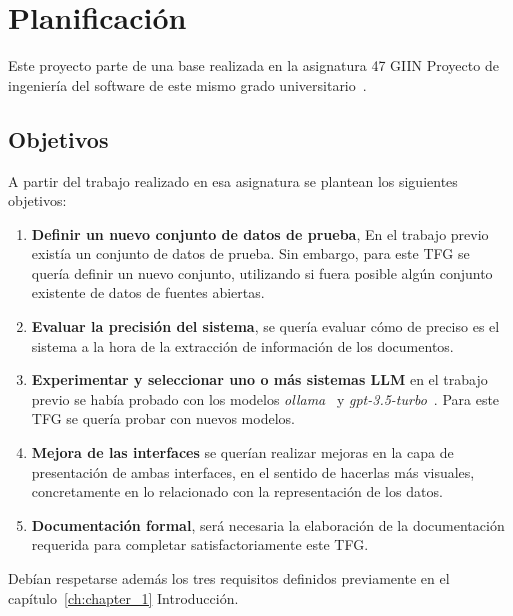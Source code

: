 \section{Planificación}\label{sec:desarrollo_de_software}

Este proyecto parte de una base realizada en la asignatura 47 GIIN Proyecto de ingeniería del
software de este mismo grado universitario~\cite{url_viu_47_proyecto}.

\subsection*{Objetivos}

A partir del trabajo realizado en esa asignatura se plantean los siguientes objetivos:

\begin{enumerate}
    \item \textbf{Definir un nuevo conjunto de datos de prueba},
    En el trabajo previo existía un conjunto de datos de prueba.
    Sin embargo, para este TFG se quería definir un nuevo conjunto, utilizando si fuera posible algún conjunto existente
    de datos de fuentes abiertas.

    \item \textbf{Evaluar la precisión del sistema},
    se quería evaluar cómo de preciso es el sistema a la hora de la extracción de información de los documentos.

    \item \textbf{Experimentar y seleccionar uno o más sistemas LLM}
    en el trabajo previo se había probado con los modelos \textit{ollama}~\cite{url_ollama} y
    \textit{gpt-3.5-turbo}~\cite{url_openai_gpt3_5}.
    Para este TFG se quería probar con nuevos modelos.

    \item \textbf{Mejora de las interfaces}
    se querían realizar mejoras en la capa de presentación de ambas interfaces, en el sentido de hacerlas más
    visuales, concretamente en lo relacionado con la representación de los datos.

    \item \textbf{Documentación formal},
    será necesaria la elaboración de la documentación requerida para completar satisfactoriamente este TFG.
\end{enumerate}

Debían respetarse además los tres requisitos definidos previamente en el capítulo~\ref{ch:chapter_1} Introducción.

